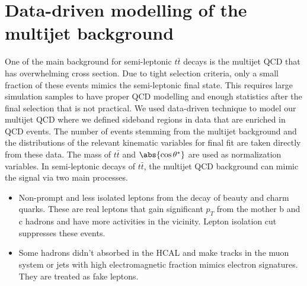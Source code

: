 \section{Data-driven modelling of the multijet background}
\label{Sec:DataDrivenQCD}
%
One of the main background for semi-leptonic $t\bar{t}$ decays is the multijet QCD that has overwhelming cross section. Due to tight selection criteria, only a small fraction of these events mimics the semi-leptonic final state. This requires large simulation samples to have proper QCD modelling and enough statistics after the final selection that is not practical. We used data-driven technique to model our multijet QCD where we defined sideband regions in data that are enriched in QCD events. The number of events stemming from the multijet background and the distributions of the relevant kinematic variables for final fit are taken directly from these data. The mass of $t\bar{t}$ and $\abs{\cos\theta^*}$ are used as normalization variables. In semi-leptonic decays of $t\bar{t}$, the multijet QCD background can mimic the signal via two main processes.
\begin{itemize}
\item Non-prompt and less isolated leptons from the decay of beauty and charm quarks. These are real leptons that gain significant $p_{T}$ from the mother b and c hadrons and have more activities in the vicinity. Lepton isolation cut suppresses these events.
\item Some hadrons didn't absorbed in the HCAL and make tracks in the muon system or jets with high electromagnetic fraction mimics electron signatures. They are treated as fake leptons.  
\end{itemize}

